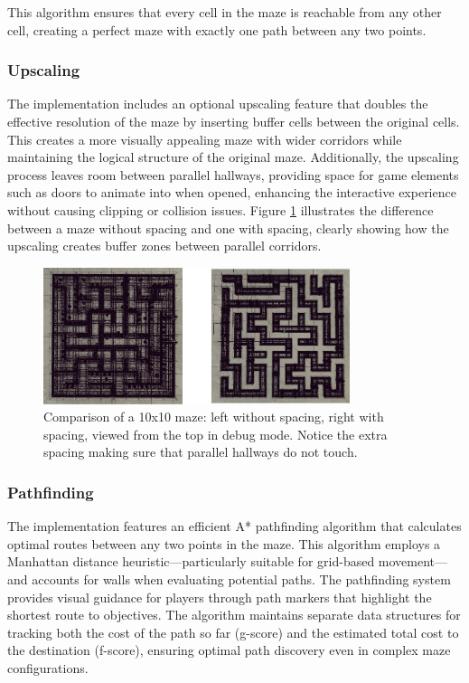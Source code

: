 \documentclass{article}
\begin{document}
This algorithm ensures that every cell in the maze is reachable from any other cell, creating a perfect maze with exactly one path between any two points.

\subsubsection{Upscaling}
The implementation includes an optional upscaling feature that doubles the effective resolution of the maze by inserting buffer cells between the original cells. This creates a more visually appealing maze with wider corridors while maintaining the logical structure of the original maze. Additionally, the upscaling process leaves room between parallel hallways, providing space for game elements such as doors to animate into when opened, enhancing the interactive experience without causing clipping or collision issues. Figure \ref{fig:maze-spacing} illustrates the difference between a maze without spacing and one with spacing, clearly showing how the upscaling creates buffer zones between parallel corridors.

\begin{figure}[H]
    \centering
    \includegraphics[width=0.8\textwidth]{diagrams/spacing.png}
    \caption{Comparison of a 10x10 maze: left without spacing, right with spacing, viewed from the top in debug mode. Notice the extra spacing making sure that parallel hallways do not touch.}
    \label{fig:maze-spacing}
\end{figure}

\subsubsection{Pathfinding}
The implementation features an efficient A* pathfinding algorithm that calculates optimal routes between any two points in the maze. This algorithm employs a Manhattan distance heuristic—particularly suitable for grid-based movement—and accounts for walls when evaluating potential paths. The pathfinding system provides visual guidance for players through path markers that highlight the shortest route to objectives. The algorithm maintains separate data structures for tracking both the cost of the path so far (g-score) and the estimated total cost to the destination (f-score), ensuring optimal path discovery even in complex maze configurations.
\end{document}
